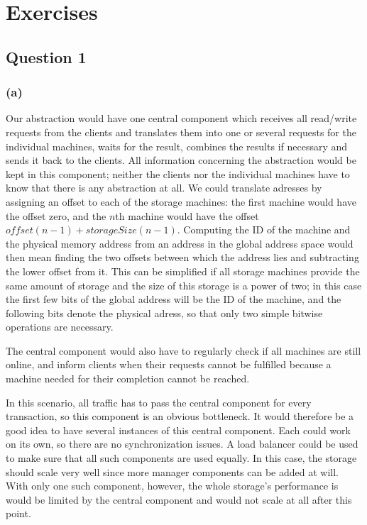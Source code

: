 \documentclass[12pt,a4paper]{article}
\begin{document}
\section*{Exercises} 
\label{sec:exercises}

\subsection*{Question 1}
\label{sec:eq1}
\subsubsection*{(a)}
Our abstraction would have one central component which receives all read/write requests from the clients and translates them into one or several requests for the individual machines, waits for the result, combines the results if necessary and sends it back to the clients. All information concerning the abstraction would be kept in this component; neither the clients nor the individual machines have to know that there is any abstraction at all. We could translate adresses by assigning an offset to each of the storage machines: the first machine would have the offset zero, and the $n$th machine would have the offset $offset(n-1) + storageSize(n-1)$. Computing the ID of the machine and the physical memory address from an address in the global address space would then mean finding the two offsets between which the address lies and subtracting the lower offset from it.
This can be simplified if all storage machines provide the same amount of storage and the size of this storage is a power of two; in this case the first few bits of the global address will be the ID of the machine, and the following bits denote the physical adress, so that only two simple bitwise operations are necessary.

The central component would also have to regularly check if all machines are still online, and inform clients when their requests cannot be fulfilled because a machine needed for their completion cannot be reached. 

In this scenario, all traffic has to pass the central component for every transaction, so this component is an obvious bottleneck. It would therefore be a good idea to have several instances of this central component. Each could work on its own, so there are no synchronization issues. A load balancer could be used to make sure that all such components are used equally. In this case, the storage should scale very well since more manager components can be added at will. With only one such component, however, the whole storage's performance is would be limited by the central component and would not scale at all after this point.
\end{document}
